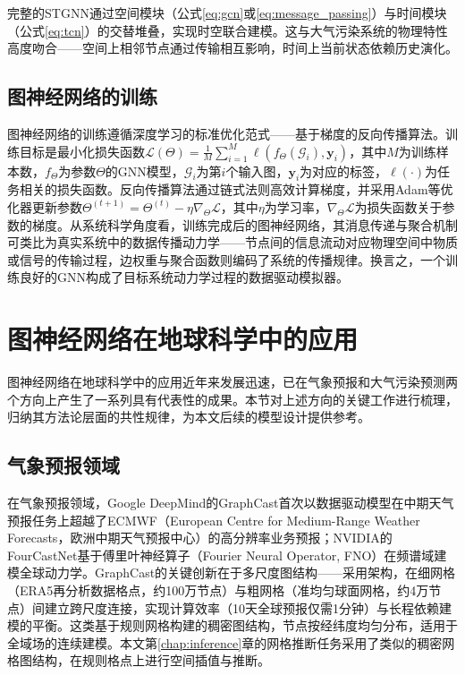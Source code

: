 完整的STGNN通过空间模块（公式\eqref{eq:gcn}或\eqref{eq:message_passing}）与时间模块（公式\eqref{eq:tcn}）的交替堆叠，实现时空联合建模。这与大气污染系统的物理特性高度吻合——空间上相邻节点通过传输相互影响，时间上当前状态依赖历史演化。

\subsection{图神经网络的训练}
\label{subsec:gnn_training}

图神经网络的训练遵循深度学习的标准优化范式——基于梯度的反向传播算法\citep{goodfellow2016deep}。训练目标是最小化损失函数$\mathcal{L}(\Theta) = \frac{1}{M} \sum_{i=1}^{M} \ell(f_\Theta(\mathcal{G}_i), \mathbf{y}_i)$，其中$M$为训练样本数，$f_\Theta$为参数$\Theta$的GNN模型，$\mathcal{G}_i$为第$i$个输入图，$\mathbf{y}_i$为对应的标签，$\ell(\cdot)$为任务相关的损失函数。反向传播算法通过链式法则高效计算梯度，并采用Adam等优化器\citep{kingma2015adam}更新参数$\Theta^{(t+1)} = \Theta^{(t)} - \eta \nabla_\Theta \mathcal{L}$，其中$\eta$为学习率，$\nabla_\Theta \mathcal{L}$为损失函数关于参数的梯度。从系统科学角度看，训练完成后的图神经网络，其消息传递与聚合机制可类比为真实系统中的数据传播动力学——节点间的信息流动对应物理空间中物质或信号的传输过程，边权重与聚合函数则编码了系统的传播规律。换言之，一个训练良好的GNN构成了目标系统动力学过程的数据驱动模拟器。


\section{图神经网络在地球科学中的应用}
\label{sec:gnn_earth_science}

图神经网络在地球科学中的应用近年来发展迅速，已在气象预报和大气污染预测两个方向上产生了一系列具有代表性的成果。本节对上述方向的关键工作进行梳理，归纳其方法论层面的共性规律，为本文后续的模型设计提供参考。

\subsection{气象预报领域}

在气象预报领域，Google DeepMind的GraphCast\citep{lam2023learning}首次以数据驱动模型在中期天气预报任务上超越了ECMWF（European Centre for Medium-Range Weather Forecasts，欧洲中期天气预报中心）的高分辨率业务预报；NVIDIA的FourCastNet\citep{pathak2022fourcastnet}基于傅里叶神经算子（Fourier Neural Operator, FNO）在频谱域建模全球动力学。GraphCast的关键创新在于多尺度图结构——采用架构，在细网格（ERA5再分析数据格点，约100万节点）与粗网格（准均匀球面网格，约4万节点）间建立跨尺度连接，实现计算效率（10天全球预报仅需1分钟）与长程依赖建模的平衡。这类基于规则网格构建的稠密图结构，节点按经纬度均匀分布，适用于全域场的连续建模。本文第\ref{chap:inference}章的网格推断任务采用了类似的稠密网格图结构，在规则格点上进行空间插值与推断。

